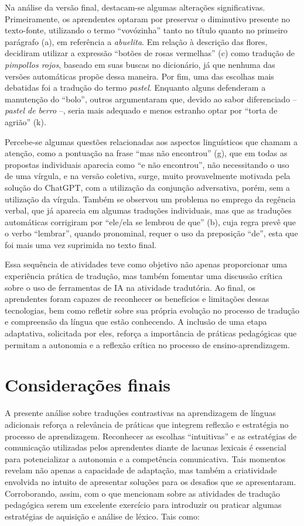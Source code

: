 \documentclass[portuguese]{textolivre}
\begin{document}
Na análise da versão final, destacam-se algumas alterações significativas. Primeiramente, os aprendentes optaram por preservar o diminutivo presente no texto-fonte, utilizando o termo “vovózinha” tanto no título quanto no primeiro parágrafo (a), em referência a \textit{abuelita}. Em relação à descrição das flores, decidiram utilizar a expressão “botões de rosas vermelhas” (c) como tradução de \textit{pimpollos rojos}, baseado em suas buscas no dicionário, já que nenhuma das versões automáticas propõe dessa maneira. Por fim, uma das escolhas mais debatidas foi a tradução do termo \textit{pastel}. Enquanto alguns defenderam a manutenção do “bolo”, outros argumentaram que, devido ao sabor diferenciado – \textit{pastel de berro} –, seria mais adequado e menos estranho optar por “torta de agrião” (k).

Percebe-se algumas questões relacionadas aos aspectos linguísticos que chamam a atenção, como a pontuação na frase “mas não encontrou” (g), que em todas as propostas individuais aparecia como “e não encontrou”, não necessitando o uso de uma vírgula, e na versão coletiva, surge, muito provavelmente motivada pela solução do ChatGPT, com a utilização da conjunção adversativa, porém, sem a utilização da vírgula. Também se observou um problema no emprego da regência verbal, que já aparecia em algumas traduções individuais, mas que as traduções automáticas corrigiram por “ele/ela se lembrou de que” (b), cuja regra prevê que o verbo “lembrar”, quando pronominal, requer o uso da preposição “de”, esta que foi mais uma vez suprimida no texto final.

Essa sequência de atividades teve como objetivo não apenas proporcionar uma experiência prática de tradução, mas também fomentar uma discussão crítica sobre o uso de ferramentas de IA na atividade tradutória. Ao final, os aprendentes foram capazes de reconhecer os benefícios e limitações dessas tecnologias, bem como refletir sobre sua própria evolução no processo de tradução e compreensão da língua que estão conhecendo. A inclusão de uma etapa adaptativa, solicitada por eles, reforça a importância de práticas pedagógicas que permitam a autonomia e a reflexão crítica no processo de ensino-aprendizagem.

\section{Considerações finais}\label{sec-conclusao}
A presente análise sobre traduções contrastivas na aprendizagem de línguas adicionais reforça a relevância de práticas que integrem reflexão e estratégia no processo de aprendizagem. Reconhecer as escolhas “intuitivas” e as estratégias de comunicação utilizadas pelos aprendentes diante de lacunas lexicais é essencial para potencializar a autonomia e a competência comunicativa. Tais momentos revelam não apenas a capacidade de adaptação, mas também a criatividade envolvida no intuito de apresentar soluções para os desafios que se apresentaram. Corroborando, assim, com o que mencionam \textcite{alcarazo2014} sobre as atividades de tradução pedagógica serem um excelente exercício para introduzir ou praticar algumas estratégias de aquisição e análise de léxico. Tais como:
\end{document}
